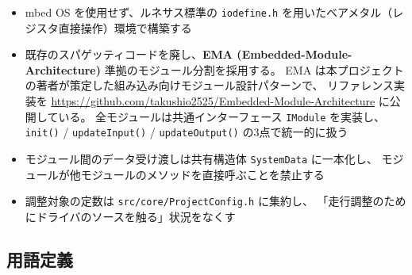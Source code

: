 \documentclass[a4paper,11pt,dvipdfmx]{jsarticle}
\begin{document}
\begin{notebox}[設計思想]
\begin{itemize}[nosep]
  \item mbed OS を使用せず、ルネサス標準の \texttt{iodefine.h} を用いたベアメタル（レジスタ直接操作）環境で構築する
  \item 既存のスパゲッティコードを廃し、\textbf{EMA (Embedded-Module-Architecture)} 準拠のモジュール分割を採用する。
        EMA は本プロジェクトの著者が策定した組み込み向けモジュール設計パターンで、
        リファレンス実装を \url{https://github.com/takushio2525/Embedded-Module-Architecture}
        に公開している。
        全モジュールは共通インターフェース \texttt{IModule} を実装し、
        \texttt{init()} / \texttt{updateInput()} / \texttt{updateOutput()} の3点で統一的に扱う
  \item モジュール間のデータ受け渡しは共有構造体 \texttt{SystemData} に一本化し、
        モジュールが他モジュールのメソッドを直接呼ぶことを禁止する
  \item 調整対象の定数は \texttt{src/core/ProjectConfig.h} に集約し、
        「走行調整のためにドライバのソースを触る」状況をなくす
\end{itemize}
\end{notebox}

\subsection{用語定義}
\end{document}
